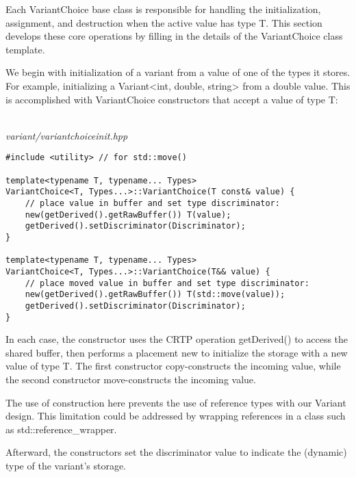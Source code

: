 

Each VariantChoice base class is responsible for handling the initialization, assignment, and destruction when the active value has type T. This section develops these core operations by filling in the details of the VariantChoice class template.



We begin with initialization of a variant from a value of one of the types it stores. For example, initializing a Variant<int, double, string> from a double value. This is accomplished with VariantChoice constructors that accept a value of type T:

\hspace*{\fill} \\ %
\noindent
\textit{variant/variantchoiceinit.hpp}
\begin{lstlisting}[style=styleCXX]
#include <utility> // for std::move()

template<typename T, typename... Types>
VariantChoice<T, Types...>::VariantChoice(T const& value) {
	// place value in buffer and set type discriminator:
	new(getDerived().getRawBuffer()) T(value);
	getDerived().setDiscriminator(Discriminator);
}

template<typename T, typename... Types>
VariantChoice<T, Types...>::VariantChoice(T&& value) {
	// place moved value in buffer and set type discriminator:
	new(getDerived().getRawBuffer()) T(std::move(value));
	getDerived().setDiscriminator(Discriminator);
}
\end{lstlisting}

In each case, the constructor uses the CRTP operation getDerived() to access the shared buffer, then performs a placement new to initialize the storage with a new value of type T. The first constructor copy-constructs the incoming value, while the second constructor move-constructs the incoming value.

\begin{tcolorbox}[colback=webgreen!5!white,colframe=webgreen!75!black]
\hspace*{0.75cm}The use of construction here prevents the use of reference types with our Variant design. This limitation could be addressed by wrapping references in a class such as std::reference\_wrapper.
\end{tcolorbox}

Afterward, the constructors set the discriminator value to indicate the (dynamic) type of the variant’s storage.

